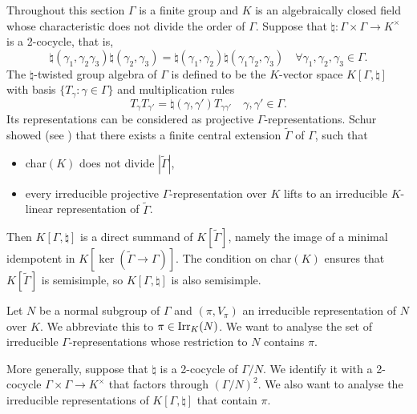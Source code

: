 \documentclass[11pt]{amsart}
\theoremstyle{definition}
\def\Irr{{\rm Irr}}
\begin{document}
Throughout this section $\Gamma$ is a finite group and $K$ is an algebraically 
closed field whose characteristic does not divide the order of $\Gamma$.
Suppose that $\natural : \Gamma \times \Gamma \to K^\times$ is a 2-cocycle, that is,
\begin{equation}\label{eq:1.1}
\natural (\gamma_1,\gamma_2 \gamma_3) \natural (\gamma_2,\gamma_3) =
\natural (\gamma_1,\gamma_2) \natural (\gamma_1 \gamma_2,\gamma_3)
\quad \forall \gamma_1,\gamma_2,\gamma_3 \in \Gamma .
\end{equation}
The $\natural$-twisted group algebra of $\Gamma$ is defined to be the $K$-vector 
space $K[\Gamma,\natural]$ with basis $\{ T_\gamma : \gamma \in \Gamma \}$ 
and multiplication rules
\begin{equation}\label{eq:1.2}
T_\gamma T_{\gamma'} = \natural (\gamma,\gamma') T_{\gamma \gamma'} \quad
\gamma, \gamma' \in \Gamma .
\end{equation}
Its representations can be considered as projective $\Gamma$-representations.
Schur showed (see \cite[Theorem 53.7]{CuRe}) that there exists a finite central
extension $\tilde \Gamma$ of $\Gamma$, such that 
\begin{itemize}
\item char$(K)$ does not divide $|\tilde \Gamma|$,
\item every irreducible projective $\Gamma$-representation over $K$ lifts to
an irreducible $K$-linear representation of $\tilde \Gamma$.
\end{itemize}
Then $K[\Gamma,\natural]$ is a direct summand of $K[\tilde \Gamma]$, namely the
image of a minimal idempotent in $K[\ker (\tilde \Gamma \to \Gamma)]$. The condition
on char$(K)$ ensures that $K[\tilde \Gamma]$ is semisimple, so $K[\Gamma,\natural]$
is also semisimple.

Let $N$ be a normal subgroup of $\Gamma$ and $(\pi,V_\pi)$ an irreducible
representation of $N$ over $K$. We abbreviate this to $\pi \in \Irr_K (N)$.
We want to analyse the set of irreducible $\Gamma$-representations whose 
restriction to $N$ contains $\pi$. 

More generally, suppose that $\natural$ is a 2-cocycle of $\Gamma / N$. We identify
it with a 2-cocycle $\Gamma \times \Gamma \to K^\times$ that factors through 
$(\Gamma / N)^2$. We also want to analyse the irreducible representations of
$K [\Gamma,\natural]$ that contain $\pi$.
\end{document}
